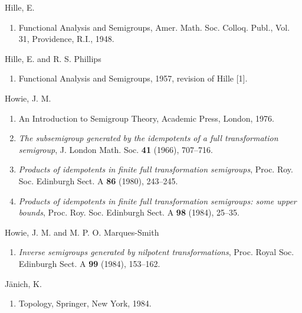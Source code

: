 \documentclass{surv-l}
\numberwithin{equation}{section}
\numberwithin{table}{section}
\numberwithin{figure}{section}
\theoremstyle{plain}
\theoremstyle{definition}
\begin{document}
\begin{thebibliography}{}
\item[] Hille, E.
\begin{enumerate}
\item \label{bib29} Functional Analysis and Semigroups, Amer. Math. Soc.
Colloq. Publ., Vol. 31, Providence, R.I., 1948.
\end{enumerate}

\item[] Hille, E. and R. S. Phillips
\begin{enumerate}
\item \label{bib30} Functional Analysis and Semigroups, 1957, revision of
Hille [1].
\end{enumerate}

\item[] Howie, J. M.
\begin{enumerate}
\item \label{bib31} An Introduction to Semigroup Theory, Academic Press,
London, 1976.

\item \label{bib31a} \emph{The subsemigroup generated by the idempotents of
a full transformation semigroup}, J. London Math. Soc.
\textbf{41} (1966), 707--716.

\item \label{bib31b} \emph{Products of idempotents in finite full
transformation semigroups}, Proc. Roy. Soc. Edinburgh
Sect. A \textbf{86} (1980), 243--245.

\item \label{bib31c} \emph{Products of idempotents in finite full
transformation semigroups: some upper bounds}, Proc. Roy.
Soc. Edinburgh Sect. A \textbf{98} (1984), 25--35.
\end{enumerate}

\item[] Howie, J. M. and M. P. O. Marques-Smith
\begin{enumerate}
\item \label{bib32} \emph{Inverse semigroups generated by nilpotent
transformations}, Proc. Royal Soc. Edinburgh Sect. A
\textbf{99} (1984), 153--162.
\end{enumerate}

\item[] J\"{a}nich, K.
\begin{enumerate}
\item \label{bib33} Topology, Springer, New York, 1984.
\end{enumerate}


\end{thebibliography}
\end{document}
